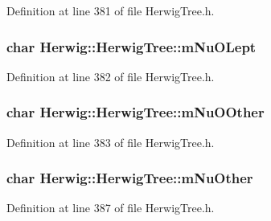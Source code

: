 Definition at line 381 of file Herwig\+Tree.\+h.

\subsubsection[{\texorpdfstring{m\+Nu\+O\+Lept}{mNuOLept}}]{\setlength{\rightskip}{0pt plus 5cm}char Herwig\+::\+Herwig\+Tree\+::m\+Nu\+O\+Lept\hspace{0.3cm}{\ttfamily [protected]}}\hypertarget{class_herwig_1_1_herwig_tree_a68bc0ced9a248641fa1448a2d4fcc5b6}{}\label{class_herwig_1_1_herwig_tree_a68bc0ced9a248641fa1448a2d4fcc5b6}


Definition at line 382 of file Herwig\+Tree.\+h.

\subsubsection[{\texorpdfstring{m\+Nu\+O\+Other}{mNuOOther}}]{\setlength{\rightskip}{0pt plus 5cm}char Herwig\+::\+Herwig\+Tree\+::m\+Nu\+O\+Other\hspace{0.3cm}{\ttfamily [protected]}}\hypertarget{class_herwig_1_1_herwig_tree_a602e6fb6d9510a1b4bd75d39b3995aa2}{}\label{class_herwig_1_1_herwig_tree_a602e6fb6d9510a1b4bd75d39b3995aa2}


Definition at line 383 of file Herwig\+Tree.\+h.

\subsubsection[{\texorpdfstring{m\+Nu\+Other}{mNuOther}}]{\setlength{\rightskip}{0pt plus 5cm}char Herwig\+::\+Herwig\+Tree\+::m\+Nu\+Other\hspace{0.3cm}{\ttfamily [protected]}}\hypertarget{class_herwig_1_1_herwig_tree_ab2546c8d2a180686b60c56dab084f90e}{}\label{class_herwig_1_1_herwig_tree_ab2546c8d2a180686b60c56dab084f90e}


Definition at line 387 of file Herwig\+Tree.\+h.

